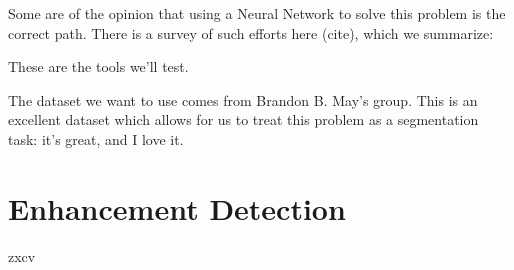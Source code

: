 \documentclass[compsoc]{IEEEtran}
\begin{document}
Some are of the opinion that using a Neural Network to solve this problem is the correct path. There is a survey of such efforts here (cite), which we summarize:

These are the tools we'll test.

The dataset we want to use comes from Brandon B. May's group. This is an excellent dataset which allows for us to treat this problem as a segmentation task: it's great, and I love it.

\section{Enhancement Detection}
zxcv



\end{document}
